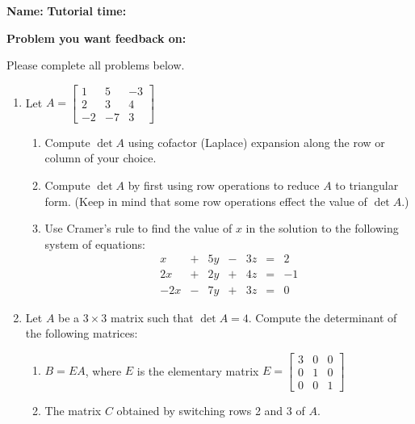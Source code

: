 \documentclass[12pt]{article}
\newcommand{\bbm}{\begin{bmatrix}}
\newcommand{\ebm}{\end{bmatrix}}
\begin{document}
{\bf \large Name:} \hspace{2.5in} {\bf Tutorial time:}

\bigskip

{\bf Problem you want feedback on:}

\bigskip

\thispagestyle{fancy}
Please complete all problems below.
 \begin{enumerate}
  \item Let $A = \bbm 1&5&-3\\2&3&4\\-2&-7&3\ebm$
\begin{enumerate}
 \item Compute $\det A$ using cofactor (Laplace) expansion along the row or column of your choice.

\vspace{3in}

 \item Compute $\det A$ by first using row operations to reduce $A$ to triangular form. (Keep in mind that some row operations effect the value of $\det A$.)

\vspace{3in}

\newpage

 \item Use Cramer's rule to find the value of $x$ in the solution to the following system of equations:
\[
 \begin{array}{ccccccc}
  x&+&5y&-&3z&=&2\\
 2x&+&2y&+&4z&=&-1\\
-2x&-&7y&+&3z&=&0
 \end{array}
\]
\end{enumerate}

\vspace{3in}

\item Let $A$ be a $3\times 3$ matrix such that $\det A = 4$. Compute the determinant of the following matrices:
\begin{enumerate}
 \item $B=EA$, where $E$ is the elementary matrix $E=\bbm 3&0&0\\0&1&0\\0&0&1\ebm$

\bigskip

 \item The matrix $C$ obtained by switching rows 2 and 3 of $A$.


\end{enumerate}
\end{enumerate}
\end{document}
